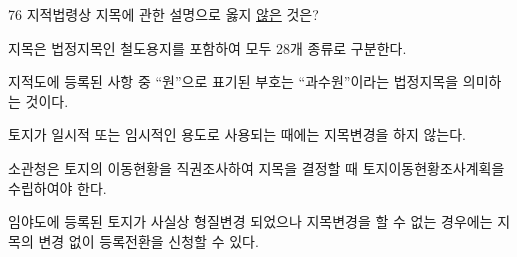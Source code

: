 \begin{question}{76}
지적법령상 지목에 관한 설명으로 옳지 \uline{않은} 것은?
\begin{choices}
  \item 지목은 법정지목인 철도용지를 포함하여 모두 28개 종류로 구분한다.
  \item 지적도에 등록된 사항 중 “원”으로 표기된 부호는 “과수원”이라는 법정지목을 의미하는 것이다.
  \item 토지가 일시적 또는 임시적인 용도로 사용되는 때에는 지목변경을 하지 않는다.
  \item 소관청은 토지의 이동현황을 직권조사하여 지목을 결정할 때 토지이동현황조사계획을 수립하여야 한다.
  \item 임야도에 등록된 토지가 사실상 형질변경 되었으나 지목변경을 할 수 없는 경우에는 지목의 변경 없이 등록전환을 신청할 수 있다.
\end{choices}
\end{question}
